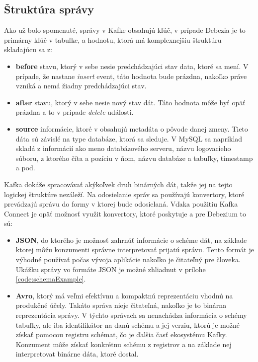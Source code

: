 \subsection{Štruktúra správy} \label{ssec:message_structure}
Ako už bolo spomenuté, správy v Kafke obsahujú kľúč, v prípade Debezia je to primárny kľúč v tabuľke, a hodnotu, ktorá má komplexnejšiu štruktúru skladajúcu sa z:
\begin{itemize}
\item \textbf{before} stavu, ktorý v sebe nesie predchádzajúci stav data, ktoré sa mení. V prípade, že nastane \textit{insert} event, táto hodnota bude prázdna, nakoľko práve vzniká a nemá žiadny predchádzajúci stav.
\item \textbf{after} stavu, ktorý v sebe nesie nový stav dát. Táto hodnota môže byť opäť prázdna a to v prípade \textit{delete} události.
\item \textbf{source} informácie, ktoré v obsahujú metadáta o pôvode danej zmeny. Tieto dáta sú závislé na type databáze, ktorá sa sleduje. V MySQL sa napríklad skladá z informácií ako meno databázového serveru, názvu logovacieho súboru, z ktorého číta a pozíciu v ňom, názvu databáze a tabuľky, timestamp a pod.
\end{itemize}

Kafka dokáže spracovávať akýkoľvek druh binárných dát, takže jej na tejto logickej štruktúre nezáleží. Na odosielanie správ sa používajú konvertory, ktoré prevádzajú správu do formy v ktorej bude odosielaná. Vďaka použitiu Kafka Connect je opäť možnosť využit konvertory, ktoré poskytuje a pre Debezium to sú:
\begin{itemize}
\item \textbf{JSON}, do ktorého je možnosť zahrnúť informácie o schéme dát, na základe ktorej môžu konzumenti správne interpretovať prijatú správu. Tento formát je výhodné používať počas vývoja aplikácie nakoľko je čitateľný pre človeka. Ukážku správy vo formáte JSON je možné zhliadnut v prílohe \ref{code:schemaExample}.
\item \textbf{Avro}, ktorý má veľmi efektívnu a kompaktnú reprezentáciu vhodnú na produkčné účely. Takáto správa nieje čitateľná, nakoľko je to binárna reprezentácia správy. V týchto správach sa nenachádza informácia o schémy tabuľky, ale iba identifikátor na danú schému a jej verziu, ktorú je možné získať pomocou registru schémat, čo je ďalšia časť ekosystému Kafky. Konzument môže získať konkrétnu schému z registrov a na základe nej interpretovat binárne dáta, ktoré dostal.
\end{itemize}

